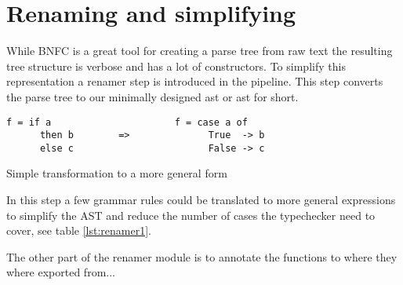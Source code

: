 \section{Renaming and simplifying}
While BNFC is a great tool for creating a parse tree from raw text the resulting 
tree structure is verbose and has a lot of constructors. To simplify this representation 
a renamer step is introduced in the pipeline. This step converts the parse tree
to our minimally designed \acrlong{ast} or \acrshort{ast} for short. 

\begin{table}
\begin{lstlisting} 
f = if a                      f = case a of
      then b        =>              True  -> b
      else c                        False -> c
\end{lstlisting}
\caption{Simple transformation to a more general form}
\label{lst:renamer1}
\end{table}

In this step a few grammar rules could be translated to more general expressions
to simplify the AST and reduce the number of cases the typechecker need to cover, see
table \ref{lst:renamer1}.

The other part of the renamer module is to annotate the functions to where they
where exported from...
